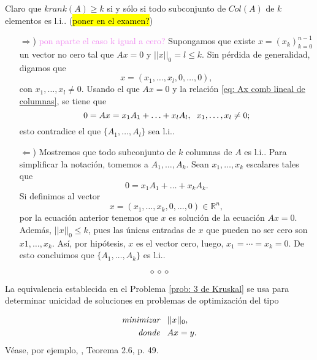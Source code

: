 \documentclass[10pt]{extreport}
\newcommand{\hlgray}[1]{{\sethlcolor{lightgray}\hl{#1}}}
\newcommand*{\IR}{\mathbb{R}}
\newcommand{\TODO}[1]{\textcolor{violet}{#1}} %
\begin{document}
	Claro que $krank(A) \geq k$ si y sólo si todo subconjunto
	de $Col(A)$ de $k$ elementos es l.i.. (\hlgray{poner en el examen?})
	\begin{itemize}
	\item [$\Rightarrow$)]
	\TODO{pon aparte el caso k igual a cero?}
	Supongamos que existe $x = (x_{k})_{k=0}^{n-1}$ un vector
	no cero tal que $Ax = 0$ y $||x||_{0} = l \leq k$. Sin pérdida de
	generalidad, digamos que 
	\[
	x = (x_{1}, \ldots , x_{l}, 0, \ldots , 0),
	\]
	con $x_{1}, \ldots, x_{l} \neq 0$.
	Usando el que $Ax = 0$ y la relación \eqref{eq: Ax comb lineal de columnas},
	se tiene que
	\[
	0 = Ax = x_{1} A_{1} + \ldots + x_{l} A_{l}, 
	\hspace{0.2cm} x_{1}, \ldots, x_{l} \neq 0;
	\]
	esto contradice el que $\{ A_{1}, \ldots , A_{l} \}$ sea l.i..
	
	\item[$\Leftarrow$)] Mostremos que todo subconjunto de $k$
	columnas de $A$ es l.i.. Para simplificar la notación, tomemos a 
	$A_{1}, \ldots , A_{k}$. Sean $x_{1}, \ldots , x_{k}$ escalares 
	tales que
	\[
	0 = x_{1} A_{1} + \ldots + x_{k} A_{k}.
	\]
	Si definimos al vector 
	\[
	x = (x_{1}, \ldots , x_{k}, 0, \ldots , 0) \in \IR^{n},
	\]
	por la ecuación anterior tenemos que $x$ es solución de
	la ecuación $Ax = 0$. Además, $|| x ||_{0} \leq k$, pues las únicas
	entradas de $x$ que pueden no ser cero son $x{1}, \ldots , x_{k}$.
	Así, por hipótesis, $x$ es el vector cero, luego, 
	$x_{1} = \cdots = x_{k} = 0$. De esto concluimos que 
	$\{A_{1}, \ldots , A_{k}\}$ es l.i..
\end{itemize}


\vspace{1cm}

\[
\diamond \diamond \diamond
\]

\vspace{1cm}

La equivalencia establecida en el Problema 
\ref{prob: 3 de Kruskal} se usa para determinar unicidad de soluciones
en problemas de optimización del tipo

\begin{align*}
	\textit{minimizar} & \hspace{0.3cm} || x ||_{0}, \\
	\textit{donde} & \hspace{0.3cm} Ax = y.
\end{align*}
Véase, por ejemplo, \cite{highDimDA}, Teorema 2.6, p. 49.

{\let\clearpage\relax \printbibliography}
\end{document}
